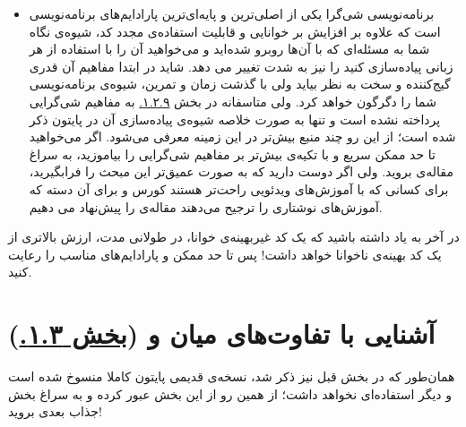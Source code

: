 \documentclass[11pt, a4paper]{article}
\begin{document}
\begin{itemize}[label=\Large $\bullet$]
  \item
  برنامه‌نویسی شی‌گرا یکی از اصلی‌ترین و پایه‌ای‌ترین پارادایم‌های برنامه‌نویسی است
  که علاوه بر افزایش بر خوانایی و قابلیت استفاده‌ی مجدد کد،
  شیوه‌ی نگاه شما به مسئله‌ای که با آن‌ها روبرو شده‌اید
  و می‌خواهید آن را با استفاده از هر زبانی پیاده‌سازی کنید را نیز به شدت تغییر می دهد.
  شاید در ابتدا مفاهیم آن قدری گیج‌کننده و سخت به نظر بیاید ولی با گذشت زمان و تمرین،
  شیوه‌ی برنامه‌نویسی شما را دگرگون خواهد کرد.
  ولی متاسفانه در بخش
  \href{https://scipy-lectures.org/intro/language/oop.html}{۱.۲.۹.}
  به مفاهیم شی‌گرایی پرداخته نشده است و تنها به صورت خلاصه شیوه‌ی پیاده‌سازی‌ آن در پایتون ذکر شده است؛
  از این رو چند منبع بیش‌تر در این زمینه معرفی می‌شود.
  اگر می‌خواهید تا حد ممکن سریع و با تکیه‌ی بیش‌تر بر مفاهیم شی‌گرایی را بیاموزید،
  به سراغ مقاله‌ی
  \href{https://towardsdatascience.com/understand-o-o-p-in-python-with-one-article-bfa76f3ba48c}{}
  بروید.
  ولی اگر دوست دارید که به صورت عمیق‌تر این مبحث را فرابگیرید،
  برای کسانی که با آموزش‌های ویدئویی راحت‌تر هستند کورس
  \href{https://learn.datacamp.com/courses/object-oriented-programming-in-python}{}
  و برای آن دسته که آموزش‌های نوشتاری را ترجیح می‌دهند مقاله‌ی
  \href{https://realpython.com/python3-object-oriented-programming/}{}
  را پیش‌نهاد می دهیم.
\end{itemize}

در آخر به یاد داشته باشید که یک کد غیربهینه‌ی خوانا،
در طولانی مدت،
ارزش بالاتری از یک کد بهینه‌ی ناخوانا خواهد داشت!
پس تا حد ممکن
و پارادایم‌های مناسب را رعایت کنید.


\section{آشنایی با تفاوت‌های میان  و  (\href{https://scipy-lectures.org/intro/python_2_python_3.html}{بخش ۱.۳.})}
همان‌طور که در بخش قبل نیز ذکر شد،
نسخه‌ی قدیمی پایتون کاملا منسوخ شده است و دیگر استفاده‌ای نخواهد داشت؛
از همین رو از این بخش عبور کرده و به سراغ بخش جذاب بعدی بروید!
\end{document}
